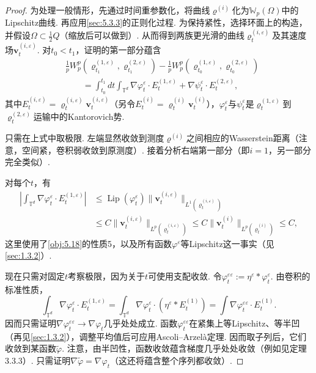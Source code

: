 \begin{proof}
\label{idx:root5-p199-torus}为处理一般情形，先通过时间重参数化，将曲线$\varrho^{(i)}$化为$\mathbb W_p(\Omega)$中的Lipschitz曲线. 再应用\autoref{sec:5.3.3}的正则化过程. 为保持紧性，选择环面上的构造，并假设$\Omega\subset\frac12Q$（缩放后可以做到）. 从而得到两族更光滑的曲线$\varrho_t^{(i,\varepsilon)}$及其速度场$\mathbf v_t^{(i,\varepsilon)}$. 对$t_0<t_1$，证明的第一部分蕴含
\[
\begin{aligned}
&\frac1pW_p^p(\varrho_{t_1}^{(1,\varepsilon)},\varrho_{t_1}^{(2,\varepsilon)})
-\frac1pW_p^p(\varrho_{t_0}^{(1,\varepsilon)},\varrho_{t_0}^{(2,\varepsilon)})\\
&\qquad=\int_{t_0}^{t_1}dt\int_{\mathbb T^d}
\nabla\varphi_t^\varepsilon\cdot E_t^{(1,\varepsilon)}
+\nabla\psi_t^\varepsilon\cdot E_t^{(2,\varepsilon)},
\end{aligned}
\]
其中$E_t^{(i,\varepsilon)}=\varrho_t^{(i,\varepsilon)}\mathbf v_t^{(i,\varepsilon)}$（另令$E_t^{(i)}=\varrho_t^{(i)}\mathbf v_t^{(i)}$），$\varphi_t^\varepsilon$与$\psi_t^\varepsilon$是$\varrho_t^{(1,\varepsilon)}$到$\varrho_t^{(2,\varepsilon)}$运输中的Kantorovich势.

只需在上式中取极限. 左端显然收敛到测度$\varrho^{(i)}$之间相应的Wasserstein距离（注意，空间紧，卷积弱收敛到原测度）. 接着分析右端第一部分（即$i=1$，另一部分完全类似）.

对每个$t$，有
\[
\begin{aligned}
\left|\int_{\mathbb T^d}\nabla\varphi_t^\varepsilon\cdot E_t^{(1,\varepsilon)}\right|
&\le\operatorname{Lip}(\varphi_t^\varepsilon)\|\mathbf v_t^{(i,\varepsilon)}\|_{L^1(\varrho_t^{(i,\varepsilon)})}\\
&\le C\|\mathbf v_t^{(i,\varepsilon)}\|_{L^p(\varrho_t^{(i,\varepsilon)})}
\le C\|\mathbf v_t^{(i)}\|_{L^p(\varrho_t^{(i)})}\le C,
\end{aligned}
\]
这里使用了\autoref{obj:5.18}的性质5，以及所有函数$\varphi^\varepsilon$等Lipschitz这一事实（见\autoref{sec:1.3.2}）.

现在只需对固定$t$考察极限，因为关于$t$可使用支配收敛. 令$\varphi_t^{\varepsilon\varepsilon}:=\eta^\varepsilon*\varphi_t^\varepsilon$. 由卷积的标准性质，
\[
\int_{\mathbb T^d}\nabla\varphi_t^\varepsilon\cdot E_t^{(1,\varepsilon)}
=\int_{\mathbb T^d}\nabla\varphi_t^\varepsilon\cdot(\eta^\varepsilon*E_t^{(1)})
=\int\nabla\varphi_t^{\varepsilon\varepsilon}\cdot E_t^{(1)}.
\]
\label{idx:root5-p200-semiconcavity}因而只需证明$\nabla\varphi_t^{\varepsilon\varepsilon}\to\nabla\varphi_t$几乎处处成立. 函数$\varphi_t^{\varepsilon\varepsilon}$在紧集上等Lipschitz、等半凹（再见\autoref{sec:1.3.2}），调整平均值后可应用Ascoli--Arzelà定理. 因而取子列后，它们收敛到某函数$\widetilde\varphi$. 注意，由半凹性，函数收敛蕴含梯度几乎处处收敛（例如见\cite{b102}定理3.3.3）. 只需证明$\nabla\widetilde\varphi=\nabla\varphi_t$（这还将蕴含整个序列都收敛）.


\end{proof}
